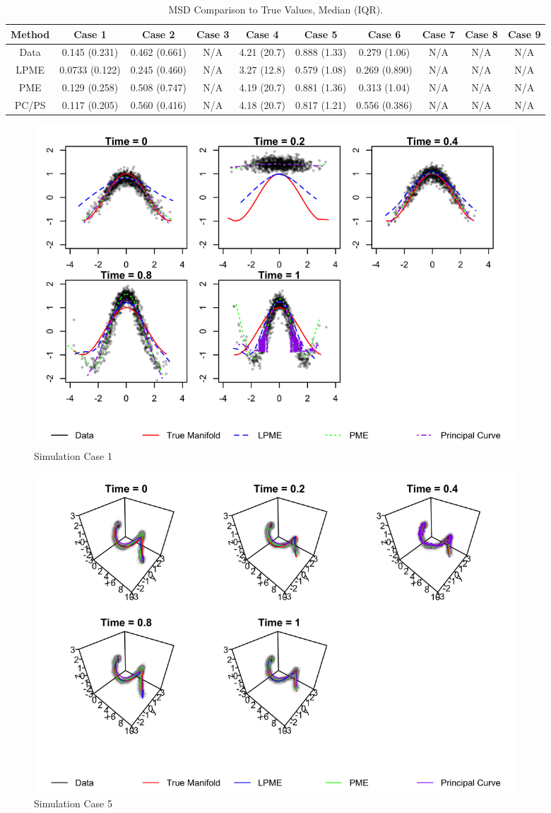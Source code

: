 \documentclass[11pt,reqno]{article}
\renewcommand{\textwidth}{180mm}
\theoremstyle{definition}
\begin{document}
\begin{table}[h]
  \footnotesize
  \centering
  \begin{tabular}{|c c c c c c c c c c|}
    \hline
    Method & Case 1 & Case 2 & Case 3 & Case 4 & Case 5 & Case 6 & Case 7 & Case 8 & Case 9 \\
    \hline
    Data & 0.145 (0.231) & 0.462 (0.661) & N/A & 4.21 (20.7) & 0.888 (1.33) & 0.279 (1.06) & N/A & N/A & N/A \\
    LPME & 0.0733 (0.122) & 0.245 (0.460) & N/A & 3.27 (12.8) & 0.579 (1.08) & 0.269 (0.890) & N/A & N/A & N/A \\
    PME & 0.129 (0.258) & 0.508 (0.747) & N/A & 4.19 (20.7) & 0.881 (1.36) & 0.313 (1.04) & N/A & N/A & N/A \\
    PC/PS & 0.117 (0.205) & 0.560 (0.416) & N/A & 4.18 (20.7) & 0.817 (1.21) & 0.556 (0.386) & N/A & N/A & N/A \\
    \hline
  \end{tabular}
  \caption{MSD Comparison to True Values, Median (IQR).}
  \label{table:simulation_results_median}
\end{table}

\begin{figure}[h]
  \centering
  \includegraphics[width=\textwidth]{sim_case1}
  \caption{Simulation Case 1}
  \label{fig:sim_case1}
\end{figure}

\begin{figure}[h]
  \centering
  \includegraphics[width=\textwidth]{sim_case5}
  \caption{Simulation Case 5}
  \label{fig:sim_case4}
\end{figure}
\end{document}
